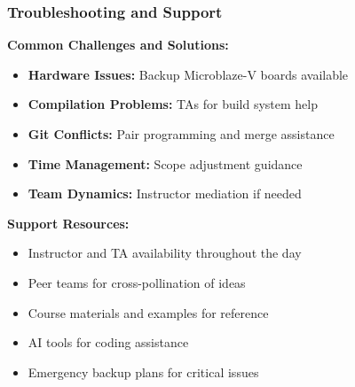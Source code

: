 \documentclass{beamer}
\begin{document}
\begin{frame}
\frametitle{Troubleshooting and Support}
\textbf{Common Challenges and Solutions:}
\begin{itemize}
    \item \footnotesize \textbf{Hardware Issues:} Backup Microblaze-V boards available
    \item \footnotesize \textbf{Compilation Problems:} TAs for build system help
    \item \footnotesize \textbf{Git Conflicts:} Pair programming and merge assistance
    \item \footnotesize \textbf{Time Management:} Scope adjustment guidance
    \item \footnotesize \textbf{Team Dynamics:} Instructor mediation if needed
\end{itemize}

\vspace{0.3cm}
\textbf{Support Resources:}
\begin{itemize}
    \item \footnotesize Instructor and TA availability throughout the day
    \item \footnotesize Peer teams for cross-pollination of ideas
    \item \footnotesize Course materials and examples for reference
    \item \footnotesize AI tools for coding assistance
    \item \footnotesize Emergency backup plans for critical issues
\end{itemize}
\end{frame}
\end{document}
